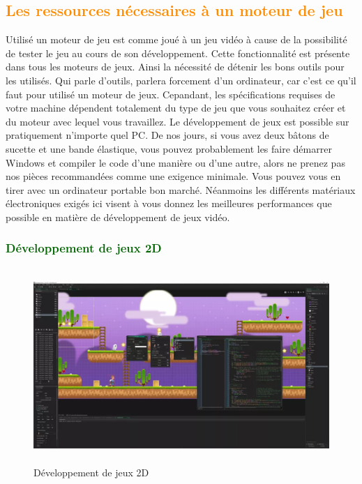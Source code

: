 \documentclass[ebook, 8pt, oneside, openany]{memoir}
\begin{document}
	\subsection{\textcolor{darkorange}{Les ressources nécessaires à un moteur de jeu}}
	Utilisé un moteur de jeu est comme joué à un jeu vidéo à cause de la possibilité de tester le jeu au
	cours de son développement. Cette fonctionnalité est présente dans tous les moteurs de jeux. Ainsi la
	nécessité de détenir les bons outils pour les utilisés. Qui parle d'outils, parlera forcement d'un
	ordinateur, car c'est ce qu'il faut pour utilisé un moteur de jeux. Cepandant, les spécifications
	requises de votre machine dépendent totalement du type de jeu que vous souhaitez créer et du moteur avec
	lequel vous travaillez. Le développement de jeux est possible sur pratiquement n'importe quel PC. De nos
	jours, si vous avez deux bâtons de sucette et une bande élastique, vous pouvez probablement les faire
	démarrer Windows et compiler le code d'une manière ou d'une autre, alors ne prenez pas nos pièces
	recommandées comme une exigence minimale. Vous pouvez vous en tirer avec un ordinateur portable bon
	marché. Néanmoins les différents matériaux électroniques exigés ici visent à vous donnez les meilleures
	performances que possible en matière de développement de jeux vidéo.
	\newpage \subsubsection{\textcolor{darkgreen}{Développement de jeux 2D}}
	\begin{figure}[h]
		\begin{center}\includegraphics[height = 210pt]{2d_game_dev.png}\end{center}
		\caption{Développement de jeux 2D}
		\label{Développement de jeux 2D}
	\end{figure}
\end{document}
